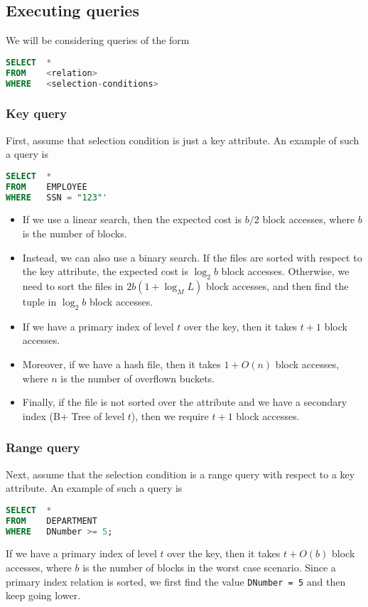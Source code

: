 \documentclass[a4paper, openany]{memoir}
\theoremstyle{definition}
\theoremstyle{plain}
\begin{document}
\subsection{Executing queries}
We will be considering queries of the form
\begin{lstlisting}[language=SQL]
SELECT  * 
FROM    <relation>
WHERE   <selection-conditions>
\end{lstlisting}

\subsubsection{Key query}
First, assume that selection condition is just a key attribute. An example of such a query is
\begin{lstlisting}[language=SQL]
SELECT  *
FROM    EMPLOYEE
WHERE   SSN = "123"'
\end{lstlisting}
\begin{itemize}
    \item If we use a linear search, then the expected cost is $b/2$ block accesses, where $b$ is the number of blocks. 
    \item Instead, we can also use a binary search. If the files are sorted with respect to the key attribute, the expected cost is $\log_2 b$ block accesses. Otherwise, we need to sort the files in $2b(1 + \log_M L)$ block accesses, and then find the tuple in $\log_2 b$ block accesses.
    \item If we have a primary index of level $t$ over the key, then it takes $t + 1$ block accesses. 
    \item Moreover, if we have a hash file, then it takes $1 + O(n)$ block accesses, where $n$ is the number of overflown buckets.
    \item Finally, if the file is not sorted over the attribute and we have a secondary index (B+ Tree of level $t$), then we require $t + 1$ block accesses.
\end{itemize}

\subsubsection{Range query}
Next, assume that the selection condition is a range query with respect to a key attribute. An example of such a query is
\begin{lstlisting}[language=SQL]
SELECT  *
FROM    DEPARTMENT
WHERE   DNumber >= 5;
\end{lstlisting}
If we have a primary index of level $t$ over the key, then it takes $t + O(b)$ block accesses, where $b$ is the number of blocks in the worst case scenario. Since a primary index relation is sorted, we first find the value \texttt{DNumber = 5} and then keep going lower.
\end{document}
